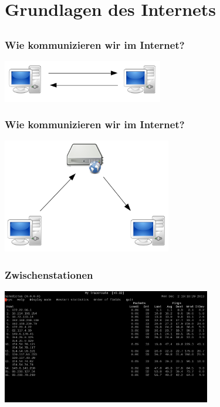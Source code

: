 \documentclass[12pt]{beamer}
\begin{document}
\section{Grundlagen des Internets}
\subsection{}

\begin{frame}
    \frametitle{Wie kommunizieren wir im Internet?}
    \begin{center}
      \includegraphics[width=7cm]{img/direkt.png}
    \end{center}
\end{frame}

\begin{frame}
    \frametitle{Wie kommunizieren wir im Internet?}
    \begin{center}
      \includegraphics[height=5cm]{img/c-s.png}
    \end{center}
\end{frame}

\begin{frame}
    \frametitle{Zwischenstationen}
    \begin{center}
      \includegraphics[height=5cm]{img/mtr.png}
    \end{center}
\end{frame}
\end{document}
